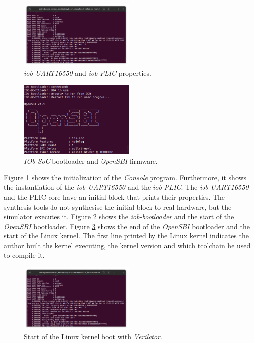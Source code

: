 \begin{figure}[!ht]
    \centering
    \includegraphics[width=0.5\textwidth]{../images/start_Linux_sim.png}
    \caption{\textit{iob-UART16550} and \textit{iob-PLIC} properties.}
    \label{fig:start_bootloader_sim}
\end{figure}
\begin{figure}[!ht]
    \centering
    \includegraphics[width=0.5\textwidth]{../images/end_bootloader_sim.png}
    \caption{\textit{IOb-SoC} bootloader and \textit{OpenSBI} firmware.}
    \label{fig:end_bootloader_sim}
\end{figure}

Figure \ref{fig:start_bootloader_sim} shows the initialization of the \textit{Console} program. Furthermore, it shows the instantiation of the \textit{iob-UART16550} and the \textit{iob-PLIC}. The \textit{iob-UART16550} and the PLIC core have an initial block that prints their properties. The synthesis tools do not synthesise the initial block to real hardware, but the simulator executes it. Figure \ref{fig:end_bootloader_sim} shows the \textit{iob-bootloader} and the start of the \textit{OpenSBI} bootloader. Figure \ref{fig:start_linux_sim} shows the end of the \textit{OpenSBI} bootloader and the start of the Linux kernel. The first line printed by the Linux kernel indicates the author built the kernel executing, the kernel version and which toolchain he used to compile it.

\begin{figure}[!ht]
    \centering
    \includegraphics[width=0.5\textwidth]{../images/start_Linux_sim.png}
    \caption{Start of the Linux kernel boot with \textit{Verilator}.}
    \label{fig:start_linux_sim}
\end{figure}


